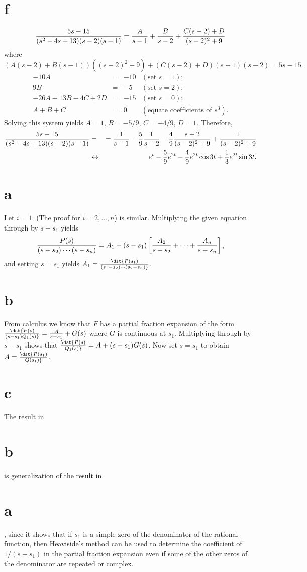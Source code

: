 \documentclass[dvips]{book}
\renewcommand{\exer}[1]{\par\medskip\;\noindent{\color{red}\bf #1.}}
\numberwithin{example}{section}
\numberwithin{equation}{section}
\numberwithin{theorem}{section}
\numberwithin{table}{section}
\numberwithin{figure}{section}
\begin{document}
\part{f}
$$
{5s-15\over(s^2-4s+13)(s-2)(s-1)}
={A\over s-1}+{B\over s-2}+{C(s-2)+D\over(s-2)^2+9}
$$
where
$$
(A(s-2)+B(s-1))((s-2)^2+9)+(C(s-2)+D)(s-1)(s-2)=5s-15.
$$
$$
\begin{array}{rcrl}
-10A&=&-10&(\mbox{set }s=1);\\
9B&=&-5& (\mbox{set }s=2);\\
-26A-13B-4C+2D&=&-15& (\mbox{set }s=0);\\
A+B+C&=&0&(\mbox{equate coefficients of }s^3).
\end{array}
$$
Solving this system yields $A=1$, $B=-5/9$,
$C=-4/9$, $D=1$. Therefore,
\begin{eqnarray*}
{5s-15\over(s^2-4s+13)(s-2)(s-1)}
&=&
={1\over s-1}-{5\over9}{1\over s-2}-{4\over9}{s-2\over(s-2)^2+9}
+{1\over(s-2)^2+9}
\\&\leftrightarrow&
e^t-{5\over9}e^{2t}-{4\over9}e^{2t}\cos 3t+{1\over3}e^{2t}\sin 3t.
\end{eqnarray*}


\exer{8.2.10}
\part{a} Let $i=1$. (The proof for $i=2,\dots,n$) is similar.
Multiplying the given equation through by $s-s_1$ yields
$$
{P(s)\over(s-s_2)\cdots(s-s_n)}=
A_1+(s-s_1)\left[{A_2\over s-s_2}+\cdots+{A_n\over s-s_n}\right],
$$
and setting $s=s_1$ yields
$A_1=\dst{P(s_1)\over(s_1-s_2)\cdots(s_2-s_n)}$.

\part{b}  From calculus we know that $F$  has a partial
fraction expansion of the form
$\dst{P(s)\over(s-s_1)Q_1(s)}={A\over s-s_1}+G(s)$ where $G$ is
continuous at $s_1$. Multiplying through by $s-s_1$ shows that
$\dst{P(s)\over Q_1(s)}=A+(s-s_1)G(s)$. Now set $s=s_1$ to obtain
$A=\dst{P(s_1)\over Q(s_1)}$.

\part{c} The result in \part{b} is generalization of the result
in \part{a}, since it shows that if $s_1$ is a simple zero
of the denominator of the rational function, then Heaviside's
method can be used to determine the coefficient of $1/(s-s_1)$
in the partial fraction expansion even if some of the other zeros
of the denominator are repeated or complex.
\end{document}
